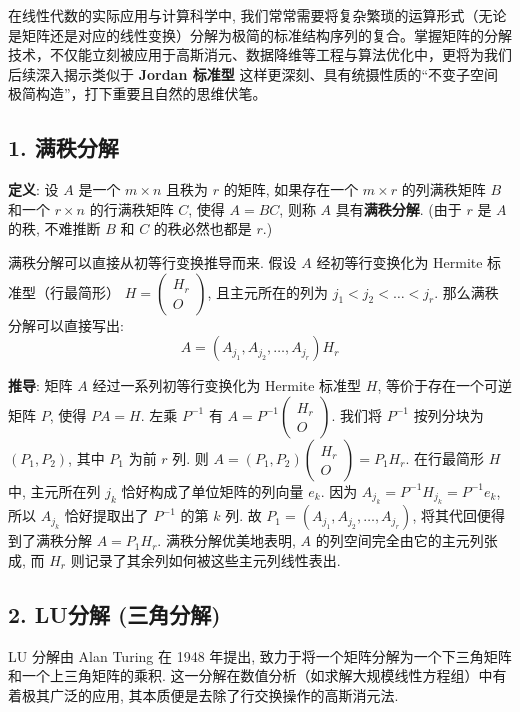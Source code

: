 \documentclass{ctexart}
\begin{document}
在线性代数的实际应用与计算科学中, 我们常常需要将复杂繁琐的运算形式（无论是矩阵还是对应的线性变换）分解为极简的标准结构序列的复合。掌握矩阵的分解技术，不仅能立刻被应用于高斯消元、数据降维等工程与算法优化中，更将为我们后续深入揭示类似于 \textbf{Jordan 标准型} 这样更深刻、具有统摄性质的“不变子空间极简构造”，打下重要且自然的思维伏笔。

\subsection{1. 满秩分解}

\textbf{定义}: 设 $A$ 是一个 $m \times n$ 且秩为 $r$ 的矩阵, 如果存在一个 $m \times r$ 的列满秩矩阵 $B$ 和一个 $r \times n$ 的行满秩矩阵 $C$, 使得 $A = BC$, 则称 $A$ 具有\textbf{满秩分解}. (由于 $r$ 是 $A$ 的秩, 不难推断 $B$ 和 $C$ 的秩必然也都是 $r$.)

满秩分解可以直接从初等行变换推导而来. 假设 $A$ 经初等行变换化为 Hermite 标准型（行最简形） $H = \begin{pmatrix} H_r \\ O \end{pmatrix}$, 且主元所在的列为 $j_1 < j_2 < \ldots < j_r$.
那么满秩分解可以直接写出:
$$ A = (A_{j_1}, A_{j_2}, \ldots, A_{j_r}) H_r $$

\textbf{推导}:
矩阵 $A$ 经过一系列初等行变换化为 Hermite 标准型 $H$, 等价于存在一个可逆矩阵 $P$, 使得 $PA = H$. 左乘 $P^{-1}$ 有 $A = P^{-1} \begin{pmatrix} H_r \\ O \end{pmatrix}$. 
我们将 $P^{-1}$ 按列分块为 $(P_1, P_2)$, 其中 $P_1$ 为前 $r$ 列. 则 $A = (P_1, P_2)\begin{pmatrix} H_r \\ O \end{pmatrix} = P_1 H_r$.
在行最简形 $H$ 中, 主元所在列 $j_k$ 恰好构成了单位矩阵的列向量 $e_k$. 因为 $A_{j_k} = P^{-1} H_{j_k} = P^{-1} e_k$, 所以 $A_{j_k}$ 恰好提取出了 $P^{-1}$ 的第 $k$ 列.
故 $P_1 = (A_{j_1}, A_{j_2}, \ldots, A_{j_r})$, 将其代回便得到了满秩分解 $A = P_1 H_r$. 满秩分解优美地表明, $A$ 的列空间完全由它的主元列张成, 而 $H_r$ 则记录了其余列如何被这些主元列线性表出.

\subsection{2. LU分解 (三角分解)}

LU 分解由 Alan Turing 在 1948 年提出, 致力于将一个矩阵分解为一个下三角矩阵和一个上三角矩阵的乘积. 这一分解在数值分析（如求解大规模线性方程组）中有着极其广泛的应用, 其本质便是去除了行交换操作的高斯消元法.
\end{document}
